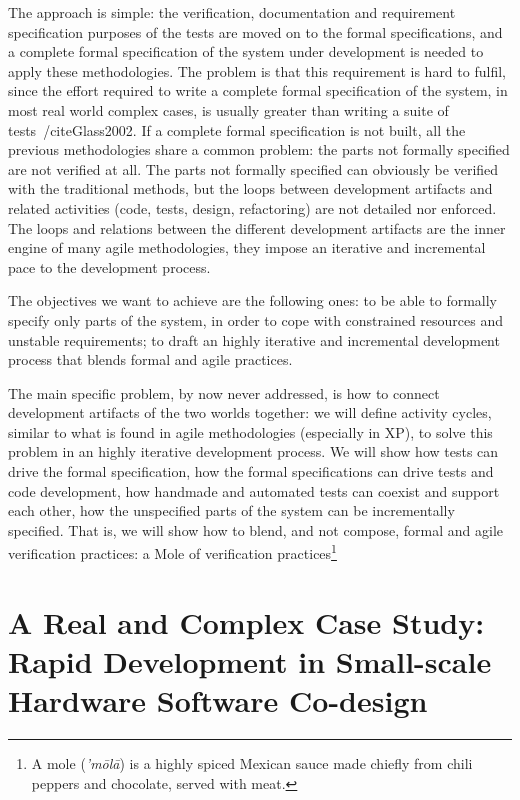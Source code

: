 \documentclass[english]{lni}
\begin{document}
The approach is simple: the verification, documentation and requirement specification purposes of the tests are moved on to the formal specifications, and a complete formal specification of the system under development is needed to apply these methodologies.
The problem is that this requirement is hard to fulfil, since the effort required to write a complete formal specification of the system, in most real world complex cases, is usually greater than writing a suite of tests~/cite{Glass2002}.
If a complete formal specification is not built, all the previous methodologies share a common problem: the parts not formally specified are not verified at all.
The parts not formally specified can obviously be verified with the traditional methods, but the loops between development artifacts and related activities (code, tests, design, refactoring) are not detailed nor enforced.
The loops and relations between the different development artifacts are the inner engine of many agile methodologies, they impose an iterative and incremental pace to the development process.

The objectives we want to achieve are the following ones: to be able to formally specify only parts of the system, in order to cope with constrained resources and unstable requirements; to draft an highly iterative and incremental development process that blends formal and agile practices.

The main specific problem, by now never addressed, is how to connect development artifacts of the two worlds together: we will define activity cycles, similar to what is found in agile methodologies (especially in XP), to solve this problem in an highly iterative development process.
We will show how tests can drive the formal specification, how the formal specifications can drive tests and code development, how handmade and automated tests can coexist and support each other, how the unspecified parts of the system can be incrementally specified.
That is, we will show how to blend, and not compose, formal and agile verification practices: a Mole of verification practices\footnote{A mole (\emph{'m\=ol\=a}) is a highly spiced Mexican sauce made chiefly from chili peppers and chocolate, served with meat.}

\section{A Real and Complex Case Study: \\ Rapid Development in Small-scale Hardware Software Co-design}
\label{subsec:a_real_and_complex_case_study}
\end{document}
